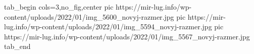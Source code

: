  
 
 
 
 


\ifcmt
  tab_begin cols=3,no_fig,center
     pic https://mir-lug.info/wp-content/uploads/2022/01/img_5600_novyj-razmer.jpg
		 pic https://mir-lug.info/wp-content/uploads/2022/01/img_5594_novyj-razmer.jpg
		 pic https://mir-lug.info/wp-content/uploads/2022/01/img_5567_novyj-razmer.jpg
  tab_end
\fi
